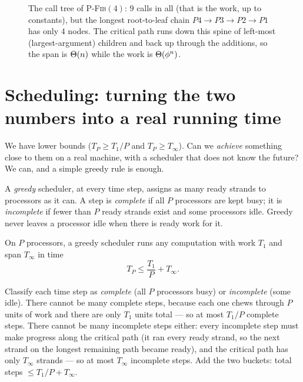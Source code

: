 \begin{figure}[h]
\centering
{}
\caption{The call tree of \textsc{P-Fib}$(4)$: $9$ calls in all (that is the
work, up to constants), but the longest root-to-leaf chain
$P4 \to P3 \to P2 \to P1$ has only $4$ nodes. The critical path runs down this
spine of left-most (largest-argument) children and back up through the additions,
so the span is $\Theta(n)$ while the work is $\Theta(\phi^n)$.}
\label{ch35:pfib-tree}
\end{figure}

\section{Scheduling: turning the two numbers into a real running time}

We have lower bounds ($T_P \ge T_1/P$ and $T_P \ge T_\infty$). Can we
\emph{achieve} something close to them on a real machine, with a scheduler that
does not know the future? We can, and a simple greedy rule is enough.

\begin{definition}\label{ch35:def-greedy}
A \emph{greedy} scheduler, at every time step, assigns as many ready strands to
processors as it can. A step is \emph{complete} if all $P$ processors are kept
busy; it is \emph{incomplete} if fewer than $P$ ready strands exist and some
processors idle. Greedy never leaves a processor idle when there is ready
work for it.
\end{definition}

\begin{theorem}\label{ch35:thm-greedy}
On $P$ processors, a greedy scheduler runs any computation with work $T_1$ and
span $T_\infty$ in time
\[
T_P \le \frac{T_1}{P} + T_\infty.
\]
\end{theorem}

\begin{intuitionbox}
Classify each time step as \emph{complete} (all $P$ processors
busy) or \emph{incomplete} (some idle). There cannot be many complete steps,
because each one chews through $P$ units of work and there are only $T_1$ units
total --- so at most $T_1/P$ complete steps. There cannot be many incomplete
steps either: every incomplete step must make progress along the critical path
(it ran every ready strand, so the next strand on the longest remaining path
became ready), and the critical path has only $T_\infty$ strands --- so at most
$T_\infty$ incomplete steps. Add the two buckets: total steps
$\le T_1/P + T_\infty$.
\end{intuitionbox}

